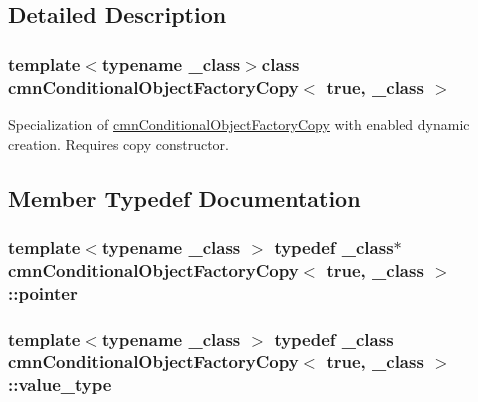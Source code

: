 \subsection{Detailed Description}
\subsubsection*{template$<$typename \-\_\-class$>$class cmn\-Conditional\-Object\-Factory\-Copy$<$ true, \-\_\-class $>$}

Specialization of \hyperlink{classcmn_conditional_object_factory_copy}{cmn\-Conditional\-Object\-Factory\-Copy} with enabled dynamic creation. Requires copy constructor. 

\subsection{Member Typedef Documentation}
\hypertarget{classcmn_conditional_object_factory_copy_3_01true_00_01__class_01_4_af5fd377a8880cde0f6579e8e35a3d3ef}{
\subsubsection[{pointer}]{\setlength{\rightskip}{0pt plus 5cm}template$<$typename \-\_\-class $>$ typedef \-\_\-class$\ast$ {\bf cmn\-Conditional\-Object\-Factory\-Copy}$<$ true, \-\_\-class $>$\-::{\bf pointer}}}\label{classcmn_conditional_object_factory_copy_3_01true_00_01__class_01_4_af5fd377a8880cde0f6579e8e35a3d3ef}
\hypertarget{classcmn_conditional_object_factory_copy_3_01true_00_01__class_01_4_ad1492fd9e525d85f29807a26148f082e}{
\subsubsection[{value\-\_\-type}]{\setlength{\rightskip}{0pt plus 5cm}template$<$typename \-\_\-class $>$ typedef \-\_\-class {\bf cmn\-Conditional\-Object\-Factory\-Copy}$<$ true, \-\_\-class $>$\-::{\bf value\-\_\-type}}}\label{classcmn_conditional_object_factory_copy_3_01true_00_01__class_01_4_ad1492fd9e525d85f29807a26148f082e}


